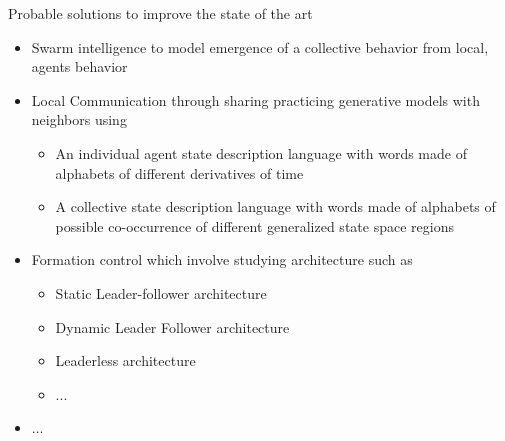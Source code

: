 \documentclass[unknownkeysallowed]{beamer}
\begin{document}
	\begin{frame}{Probable solutions to improve the state of the art}
		\begin{itemize}
			\item Swarm intelligence to model emergence of a collective behavior from local, agents behavior
			\item Local Communication through sharing practicing generative models with neighbors using 
				\begin{itemize}
					\item An individual agent state description language with words made of alphabets of different derivatives of time
					\item A collective state description language with words made of alphabets of possible co-occurrence of different generalized state space regions  
				\end{itemize}
			\item Formation control which involve studying architecture such as 
			\begin{itemize}
				\item Static Leader-follower architecture
				\item Dynamic Leader Follower architecture
				\item Leaderless architecture
				\item ...
			\end{itemize}
			\item ...
		\end{itemize}
	\end{frame}
\end{document}
